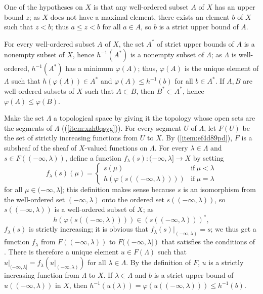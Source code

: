\documentclass{article}
\begin{document}
\begin{solution}[\ref{exe:k8tmok20}]
  \label{sol:zipx00sf}
  One of the hypotheses on \(X\) is that any well-ordered subset \(A\)
  of \(X\) has an upper bound \(z\); as \(X\) does not have a maximal
  element, there exists an element \(b\) of \(X\) such that \(z < b\);
  thus \(a \leq z < b\) for all \(a \in A\), so \(b\) is a strict
  upper bound of \(A\).

  For every well-ordered subset \(A\) of \(X\), the set \(A^*\) of
  strict upper bounds of \(A\) is a nonempty subset of \(X\), hence
  \(h^{-1}(A^*)\) is a nonempty subset of \(\Lambda\); as \(\Lambda\)
  is well-ordered, \(h^{-1}(A^*)\) has a minimum \(\varphi(A)\); thus,
  \(\varphi(A)\) is the unique element of \(\Lambda\) such that
  \(h(\varphi(A)) \in A^*\) and \(\varphi(A) \leq h^{-1}(b)\) for all
  \(b \in A^*\).  If \(A,B\) are well-ordered subsets of \(X\) such
  that \(A \subset B\), then \(B^* \subset A^*\), hence
  \(\varphi(A) \leq \varphi(B)\).

  Make the set \(\Lambda\) a topological space by giving it the
  topology whose open sets are the segments of \(\Lambda\)
  ((\ref{item:xzh0qsyg})).  For every segment \(U\)
  of \(\Lambda\), let \(F(U)\) be the set of strictly increasing
  functions from \(U\) to \(X\).  By
  (\ref{item:ef4d89pd}), \(F\) is a subsheaf of the
  sheaf of \(X\)-valued functions on \(\Lambda\).  For every
  \(\lambda \in \Lambda\) and \(s \in F((-\infty, \lambda))\), define
  a function \(f_\lambda(s) : (-\infty, \lambda] \to X\) by setting
  \begin{displaymath}
    f_\lambda(s)(\mu) =
    \begin{cases}
      s(\mu) & \text{if} ~ \mu < \lambda \\
      h(\varphi(s((-\infty, \lambda)))) & \text{if} ~ \mu = \lambda
    \end{cases}
  \end{displaymath}
  for all \(\mu \in (-\infty, \lambda]\); this definition makes sense
  because \(s\) is an isomorphism from the well-ordered set
  \((-\infty, \lambda)\) onto the ordered set
  \(s((-\infty, \lambda))\), so \(s((-\infty, \lambda))\) is a
  well-ordered subset of \(X\); as
  \begin{displaymath}
    h(\varphi(s((-\infty, \lambda)))) \in (s((-\infty, \lambda)))^*,
  \end{displaymath}
  \(f_\lambda(s)\) is strictly increasing; it is obvious that
  \(f_\lambda(s) \vert_{(-\infty, \lambda)} = s\); we thus get a
  function \(f_\lambda\) from \(F((-\infty, \lambda))\) to
  \(F((-\infty, \lambda])\) that satisfies the conditions of
  .  There is therefore a unique element
  \(u \in F(\Lambda)\) such that
  \(u \vert_{(-\infty, \lambda]} = f_\lambda(u \vert_{(-\infty,
    \lambda)})\) for all \(\lambda \in \Lambda\).  By the definition
  of \(F\), \(u\) is a strictly increasing function from \(\Lambda\)
  to \(X\).  If \(\lambda \in \Lambda\) and \(b\) is a strict upper
  bound of \(u((-\infty, \lambda))\) in \(X\), then
  \(h^{-1}(u(\lambda)) = \varphi(u((-\infty, \lambda))) \leq
  h^{-1}(b)\).


\end{solution}
\end{document}
